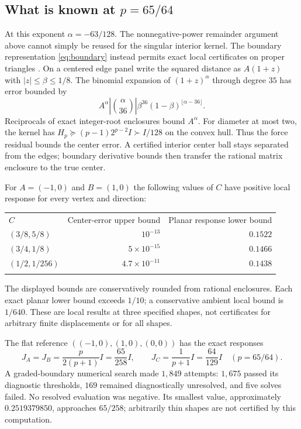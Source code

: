 \documentclass[11pt]{article}
\theoremstyle{definition}
\newcommand{\toprule}{\noalign{\hrule height 0.8pt\vskip4pt}}
\newcommand{\midrule}{\noalign{\vskip3pt\hrule height 0.4pt\vskip3pt}}
\newcommand{\bottomrule}{\noalign{\vskip3pt\hrule height 0.8pt}}
\begin{document}
\subsection{What is known at \texorpdfstring{$p=65/64$}{p=65/64}}
At this exponent $\alpha=-63/128$. The nonnegative-power remainder
argument above cannot simply be reused for the singular interior kernel.
The boundary representation \eqref{eq:boundary} instead permits exact
local certificates on proper triangles \cite{Triangle20}. On a centered
edge panel write the squared distance as $A(1+z)$ with $|z|\le\beta\le1/8$.
The binomial expansion of $(1+z)^\alpha$ through degree $35$ has error
bounded by
\[
 A^\alpha\left|\binom{\alpha}{36}\right|
 \beta^{36}(1-\beta)^{\lfloor\alpha-36\rfloor}.
\]
Reciprocals of exact integer-root enclosures bound $A^\alpha$.
For diameter at most two, the kernel has
$H_p\succeq(p-1)2^{p-2}I\succ I/128$ on the convex hull.
Thus the force residual bounds the center error. A certified interior
center ball stays separated from the edges; boundary derivative bounds
then transfer the rational matrix enclosure to the true center.

For $A=(-1,0)$ and $B=(1,0)$ the following values of $C$ have positive
local response for every vertex and direction:
\begin{center}
\begin{tabular}{@{}lrr@{}}
\toprule
$C$ & Center-error upper bound & Planar response lower bound\\
\midrule
$(3/8,5/8)$ & $10^{-13}$ & $0.1522$\\
$(3/4,1/8)$ & $5\times10^{-15}$ & $0.1466$\\
$(1/2,1/256)$ & $4.7\times10^{-11}$ & $0.1438$\\
\bottomrule
\end{tabular}
\end{center}
The displayed bounds are conservatively rounded from rational enclosures.
Each exact planar lower bound exceeds $1/10$; a conservative ambient local
bound is $1/640$. These are local results at three specified shapes, not
certificates for arbitrary finite displacements or for all shapes.

The flat reference $((-1,0),(1,0),(0,0))$ has the exact responses
\[
 J_A=J_B=\frac{p}{2(p+1)}I=\frac{65}{258}I,\qquad
 J_C=\frac1{p+1}I=\frac{64}{129}I
 \quad(p=65/64).
\]
A graded-boundary numerical search made $1{,}849$ attempts: $1{,}675$
passed its diagnostic thresholds, $169$ remained diagnostically unresolved,
and five solves failed. No resolved evaluation was negative. Its smallest
value, approximately $0.2519379850$, approaches $65/258$; arbitrarily thin
shapes are not certified by this computation.
\end{document}
